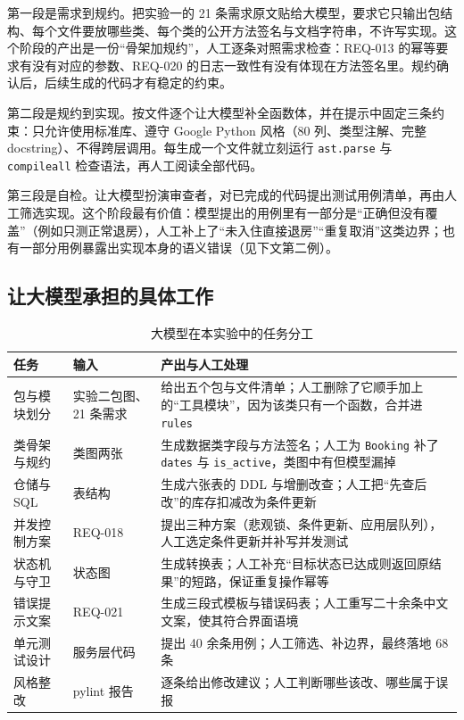 \documentclass[11pt,a4paper,fontset=none]{ctexart}
\begin{document}
第一段是需求到规约。把实验一的 21 条需求原文贴给大模型，要求它只输出包结构、每个文件要放哪些类、每个类的公开方法签名与文档字符串，不许写实现。这个阶段的产出是一份“骨架加规约”，人工逐条对照需求检查：REQ-013 的幂等要求有没有对应的参数、REQ-020 的日志一致性有没有体现在方法签名里。规约确认后，后续生成的代码才有稳定的约束。

第二段是规约到实现。按文件逐个让大模型补全函数体，并在提示中固定三条约束：只允许使用标准库、遵守 Google Python 风格（80 列、类型注解、完整 docstring）、不得跨层调用。每生成一个文件就立刻运行 \texttt{ast.parse} 与 \texttt{compileall} 检查语法，再人工阅读全部代码。

第三段是自检。让大模型扮演审查者，对已完成的代码提出测试用例清单，再由人工筛选实现。这个阶段最有价值：模型提出的用例里有一部分是“正确但没有覆盖”（例如只测正常退房），人工补上了“未入住直接退房”“重复取消”这类边界；也有一部分用例暴露出实现本身的语义错误（见下文第二例）。

\subsection{让大模型承担的具体工作}

\begin{table}[H]
\centering
\caption{大模型在本实验中的任务分工}
\small
\begin{tabularx}{\textwidth}{p{4.2cm}p{3.6cm}X}
\toprule
任务 & 输入 & 产出与人工处理 \\
\midrule
包与模块划分 & 实验二包图、21 条需求 & 给出五个包与文件清单；人工删除了它顺手加上的“工具模块”，因为该类只有一个函数，合并进 \texttt{rules} \\
类骨架与规约 & 类图两张 & 生成数据类字段与方法签名；人工为 \texttt{Booking} 补了 \texttt{dates} 与 \texttt{is\_active}，类图中有但模型漏掉 \\
仓储与 SQL & 表结构 & 生成六张表的 DDL 与增删改查；人工把“先查后改”的库存扣减改为条件更新 \\
并发控制方案 & REQ-018 & 提出三种方案（悲观锁、条件更新、应用层队列），人工选定条件更新并补写并发测试 \\
状态机与守卫 & 状态图 & 生成转换表；人工补充“目标状态已达成则返回原结果”的短路，保证重复操作幂等 \\
错误提示文案 & REQ-021 & 生成三段式模板与错误码表；人工重写二十余条中文文案，使其符合界面语境 \\
单元测试设计 & 服务层代码 & 提出 40 余条用例；人工筛选、补边界，最终落地 68 条 \\
风格整改 & pylint 报告 & 逐条给出修改建议；人工判断哪些该改、哪些属于误报 \\
\bottomrule
\end{tabularx}
\end{table}
\end{document}
